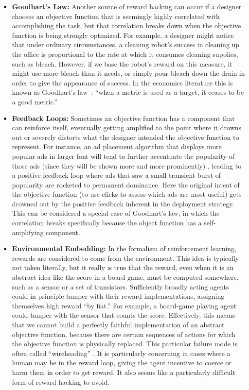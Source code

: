 \documentclass[a4paper,10pt]{article}
\begin{document}
\begin{itemize}
\item {\bf Goodhart’s Law:} Another source of reward hacking can occur if a designer chooses an objective function that is seemingly highly correlated with accomplishing the task, but that correlation breaks down when the objective function is being strongly optimized.  For example, a designer might notice that under ordinary circumstances, a cleaning robot’s success in cleaning up the office is proportional to the rate at which it consumes cleaning supplies, such as bleach.  However, if we base the robot’s reward on this measure, it might use more bleach than it needs, or simply pour bleach down the drain in order to give the appearance of success.  In the economics literature this is known as Goodhart’s law~\cite{goodhart1984problems}: ``when a metric is used as a target, it ceases to be a good metric.''  

\item {\bf Feedback Loops:} Sometimes an objective function has a component that can reinforce itself, eventually getting amplified to the point where it drowns out or severely distorts what the designer intended the objective function to represent.  For instance, an ad placement algorithm that displays more popular ads in larger font will tend to further accentuate the popularity of those ads (since they will be shown more and more prominently) \cite{bottou2012counterfactual}, leading to a positive feedback loop where ads that saw a small transient burst of popularity are rocketed to permanent dominance.  Here the original intent of the objective function (to use clicks to assess which ads are most useful) gets drowned out by the positive feedback inherent in the deployment strategy.  This can be considered a special case of Goodhart’s law, in which the correlation breaks specifically because the object function has a self-amplifying component.

\item {\bf Environmental Embedding:} In the formalism of reinforcement learning, rewards are considered to come from the environment.  This idea is typically not taken literally, but it really is true that the reward, even when it is an abstract idea like the score in a board game, must be computed somewhere, such as a sensor or a set of transistors.  Sufficiently broadly acting agents could in principle tamper with their reward implementations, assigning themselves high reward ``by fiat.''  For example, a board-game playing agent could tamper with the sensor that counts the score.  Effectively, this means that we cannot build a perfectly faithful implementation of an abstract objective function, because there are certain sequences of actions for which the objective function is physically replaced.  This particular failure mode is often called ``wireheading'' \cite{everitt2016avoiding,ring2011delusion,dewey2011learning,hadfield2016off,yampolskiy2014utility}. It is particularly concerning in cases where a human may be in the reward loop, giving the agent incentive to coerce or harm them in order to get reward. It also seems like a particularly difficult form of reward hacking to avoid.
\end{itemize}
\end{document}
